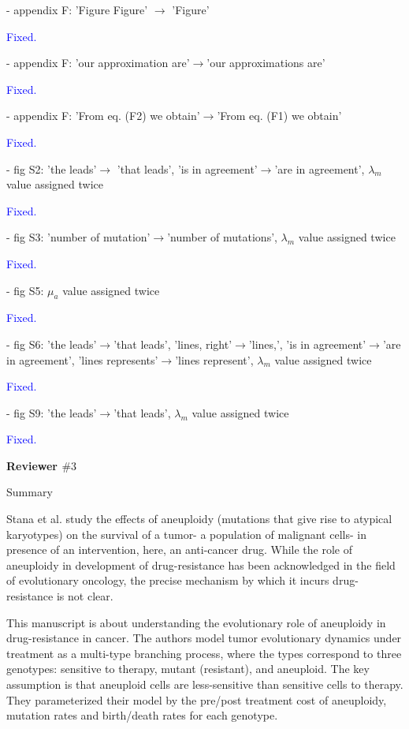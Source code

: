\documentclass[12pt]{extarticle}
\begin{document}
- appendix F: 'Figure Figure' $\rightarrow$ 'Figure'

\textcolor{blue}{Fixed.} %

- appendix F: 'our approximation are'$\rightarrow$'our approximations are'

\textcolor{blue}{Fixed.}%

- appendix F: 'From eq. (F2) we obtain'$\rightarrow$'From eq. (F1) we obtain'

\textcolor{blue}{Fixed.}%

- fig S2: 'the leads'$\rightarrow$ 'that leads', 'is in agreement'$\rightarrow$'are in agreement', $\lambda_m$ value assigned twice

\textcolor{blue}{Fixed.}%

- fig S3: 'number of mutation'$\rightarrow$'number of mutations', $\lambda_m$ value assigned twice

\textcolor{blue}{Fixed.}%

- fig S5: $\mu_a$ value assigned twice

\textcolor{blue}{Fixed.} %

- fig S6: 'the leads'$\rightarrow$'that leads', 'lines, right'$\rightarrow$'lines,', 'is in agreement'$\rightarrow$'are in agreement', 'lines represents'$\rightarrow$'lines represent', $\lambda_m$ value assigned twice

\textcolor{blue}{Fixed.} %

- fig S9: 'the leads'$\rightarrow$'that leads', $\lambda_m$ value assigned twice

\textcolor{blue}{Fixed.} %

\textbf{Reviewer $\#3$}

Summary

Stana et al. study the effects of aneuploidy (mutations that give rise to atypical karyotypes) on the survival of a tumor- a population of malignant cells- in presence of an intervention, here, an anti-cancer drug. While the role of aneuploidy in development of drug-resistance has been acknowledged in the field of evolutionary oncology, the precise mechanism by which it incurs drug-resistance is not clear.

This manuscript is about understanding the evolutionary role of aneuploidy in drug-resistance in cancer. The authors model tumor evolutionary dynamics under treatment as a multi-type branching process, where the types correspond to three genotypes: sensitive to therapy, mutant (resistant), and aneuploid. The key assumption is that aneuploid cells are less-sensitive than sensitive cells to therapy. They parameterized their model by the pre/post treatment cost of aneuploidy, mutation rates and birth/death rates for each genotype.
\end{document}

